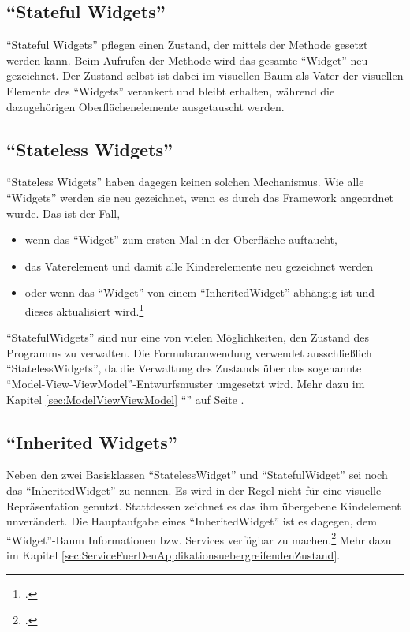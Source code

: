 \subsection{\enquote{Stateful Widgets}}

\enquote{Stateful Widgets} pflegen einen Zustand, der mittels der Methode  gesetzt werden kann.
Beim Aufrufen der Methode wird das gesamte \enquote{Widget} neu gezeichnet.
Der Zustand selbst ist dabei im visuellen Baum als Vater der visuellen Elemente des \enquote{Widgets} verankert und bleibt erhalten, während die dazugehörigen Oberflächenelemente ausgetauscht werden.

\subsection{\enquote{Stateless Widgets}}


\enquote{Stateless Widgets} haben dagegen keinen solchen Mechanismus.
Wie alle \enquote{Widgets} werden sie neu gezeichnet, wenn es durch das Framework angeordnet wurde.
Das ist der Fall,
\begin{itemize}[topsep=0pt,itemsep=-1ex,partopsep=1ex,parsep=1ex]
  \item wenn das \enquote{Widget} zum ersten Mal in der Oberfläche auftaucht,
  \item das Vaterelement und damit alle Kinderelemente neu gezeichnet werden
  \item oder wenn das \enquote{Widget} von einem \enquote{InheritedWidget} abhängig ist und dieses aktualisiert wird.\footcite[Vgl.][]{StatelessWidget}
\end{itemize}


\enquote{StatefulWidgets} sind nur eine von vielen Möglichkeiten, den Zustand des Programms zu verwalten.
Die Formularanwendung verwendet ausschließlich \enquote{StatelessWidgets}, da die Verwaltung des Zustands über das sogenannte \enquote{Model-View-ViewModel}-Entwurfsmuster umgesetzt wird.
Mehr dazu im Kapitel \ref{sec:ModelViewViewModel} \enquote{} auf Seite \pageref{sec:ModelViewViewModel}.

\subsection{\enquote{Inherited Widgets}}

Neben den zwei Basisklassen \enquote{StatelessWidget} und \enquote{StatefulWidget} sei noch das \enquote{InheritedWidget} zu nennen.
Es wird in der Regel nicht für eine visuelle Repräsentation genutzt. Stattdessen zeichnet es das ihm übergebene Kindelement unverändert.
Die Hauptaufgabe eines \enquote{InheritedWidget} ist es dagegen, dem \enquote{Widget}-Baum Informationen bzw. Services verfügbar zu machen.\footcite[Vgl.][]{InheritedWidget}
Mehr dazu im Kapitel \ref{sec:ServiceFuerDenApplikationsuebergreifendenZustand}. 


